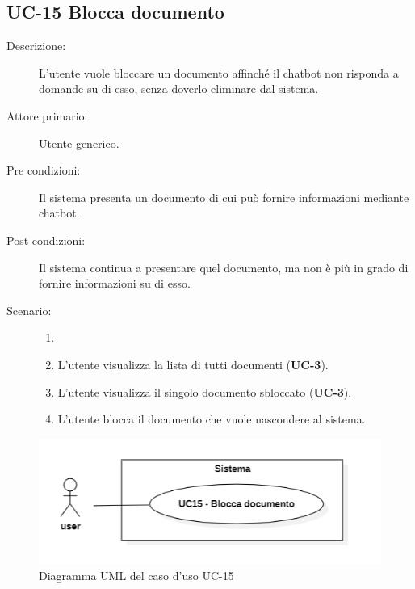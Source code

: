 \subsection{UC-15 Blocca documento}
\begin{description}
    \item[Descrizione:] L'utente vuole bloccare un documento affinché il chatbot non risponda a domande su di esso, senza doverlo eliminare dal sistema.
    \item[Attore primario:] Utente generico.
    \item[Pre condizioni:] Il sistema presenta un documento di cui può fornire informazioni mediante chatbot.
    \item[Post condizioni:] Il sistema continua a presentare quel documento, ma non è più in grado di fornire informazioni su di esso.
    \item[Scenario:]
    \begin{enumerate}
        \item[]
        \item L’utente visualizza la lista di tutti documenti (\textbf{UC-3}).
        \item L'utente visualizza il singolo documento sbloccato (\textbf{UC-3}).
        \item L'utente blocca il documento che vuole nascondere al sistema.
    \end{enumerate}
\end{description}

\begin{figure}[H]
    \centering
    \includegraphics[width=0.8\linewidth]{UC15.PNG}
    \caption{Diagramma UML del caso d'uso UC-15}
    \label{fig:UC15}
\end{figure}

